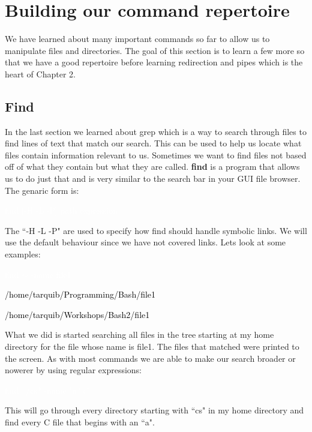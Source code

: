 \documentclass[oneside]{book}
\newcommand{\commandline}[1]{\begin{center} \colorbox{Dark}{\textcolor{white}{#1}} \end{center}}
\newcommand{\exampleout}[1]{\begin{center} \colorbox{Light}{\textcolor{black}{#1}} \end{center}}
\begin{document}
\section{Building our command repertoire}

We have learned about many important commands so far to allow us to manipulate files and directories. The goal of this section is to learn a few more so that we have a good repertoire before learning redirection and pipes which is the heart of Chapter 2. 
\subsection{Find}

    In the last section we learned about grep which is a way to search through files to find lines of text that match our search. This can be used to help us locate what files contain information relevant to us. Sometimes we want to find files not based off of what they contain but what they are called. \textbf{find} is a program that allows us to do just that and is very similar to the search bar in your GUI file browser. 
    The genaric form is:
    \commandline{find [-H -L -P] path expression}
    The ``-H -L -P" are used to specify how find should handle symbolic links. We will use the default behaviour since we have not covered links. Lets look at some examples:
    \commandline{find $\sim$ -name file1}
    \exampleout{/home/tarquib/Programming/Bash/file1}
    \exampleout{/home/tarquib/Workshops/Bash2/file1}
    What we did is started searching all files in the tree starting at my home directory for the file whose name is file1. The files that matched were printed to the screen. As with most commands we are able to make our search broader or nowerer by using regular expressions:
    \commandline{find ~/cs* -name "a*.c"}
    This will go through every directory starting with ``cs" in my home directory and find every C file that begins with an ``a". 
    
\end{document}
